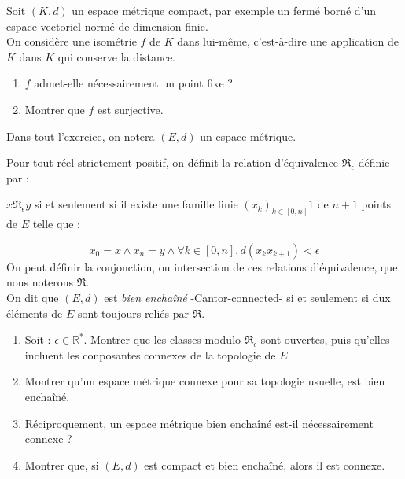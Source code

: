 \begin{exer}%
Soit $(K,d)$ un espace métrique compact, par exemple un fermé borné d'un espace vectoriel normé de dimension finie.\\
On considère une isométrie $f$ de $K$ dans lui-même, c'est-à-dire une application de $K$ dans $K$ qui conserve la distance.\\
\linebreak
\begin{enumerate}
\item $f$ admet-elle nécessairement un point fixe ?
\item Montrer que $f$ est surjective.
\end{enumerate}
\end{exer}

\begin{exer}
Dans tout l'exercice, on notera $(E,d)$ un espace m\'etrique.

\smallskip
Pour tout réel strictement positif, on définit la relation d'équivalence $\Re_{\epsilon}$ définie par :
\begin{center}
$x \Re_{\epsilon} y$ si et seulement si il existe une famille finie $(x_k)_{k \in [0,n]}1$ de $n+1$ points de $E$ telle que :
\end{center}
\[x_0 = x \wedge x_n = y \wedge \forall k \in [0,n] , d(x_k x_{k+1}) < \epsilon\]
On peut définir la conjonction, ou intersection de ces relations d'équivalence, que nous noterons $\Re$.\\
On dit que $(E,d)$ est \textit{bien enchaîné} -Cantor-connected- si et seulement si dux éléments de $E$ sont toujours reliés par $\Re$.
\begin{enumerate}
\item Soit : $\epsilon \in \mathbb{R}^{\ast}$. Montrer que les classes modulo $\Re_{\epsilon}$ sont ouvertes, puis qu'elles incluent les conposantes connexes de la topologie de $E$.
\item Montrer qu'un espace métrique connexe pour sa topologie usuelle, est bien enchaîné.
\item Réciproquement, un espace métrique bien enchaîné est-il nécessairement connexe ?
\item Montrer que, si $(E,d)$ est compact et bien enchaîné, alors il est connexe.
\end{enumerate}
\end{exer}